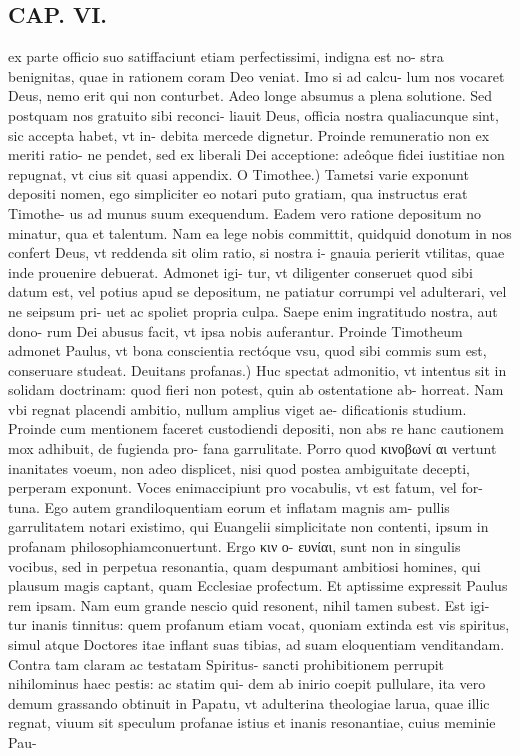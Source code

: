 \documentclass{article}
\begin{document}
\begin{pages}
\section*{CAP. VI. }
\marginpar{[ p.85 ]}\pstart ex parte officio suo satiffaciunt etiam perfectissimi, indigna est no- stra benignitas, quae in rationem coram Deo veniat. Imo si ad calcu- lum nos vocaret Deus, nemo erit qui non conturbet. Adeo longe absumus a plena solutione. Sed postquam nos gratuito sibi reconci- liauit Deus, officia nostra qualiacunque sint, sic accepta habet, vt in- debita mercede dignetur. Proinde remuneratio non ex meriti ratio- ne pendet, sed ex liberali Dei acceptione: adeôque fidei iustitiae non repugnat, vt cius sit quasi appendix.  \pend\pstart O Timothee.) Tametsi varie exponunt depositi nomen, ego simpliciter eo notari puto gratiam, qua instructus erat Timothe- us ad munus suum exequendum. Eadem vero ratione depositum no minatur, qua et talentum. Nam ea lege nobis committit, quidquid donotum in nos confert Deus, vt reddenda sit olim ratio, si nostra i- gnauia perierit vtilitas, quae inde prouenire debuerat. Admonet igi- tur, vt diligenter conseruet quod sibi datum est, vel potius apud se depositum, ne patiatur corrumpi vel adulterari, vel ne seipsum pri- uet ac spoliet propria culpa. Saepe enim ingratitudo nostra, aut dono- rum Dei abusus facit, vt ipsa nobis auferantur. Proinde Timotheum admonet Paulus, vt bona conscientia rectóque vsu, quod sibi commis sum est, conseruare studeat.  \pend\pstart Deuitans profanas.) Huc spectat admonitio, vt intentus sit in solidam doctrinam: quod fieri non potest, quin ab ostentatione ab- horreat. Nam vbi regnat placendi ambitio, nullum amplius viget ae- dificationis studium. Proinde cum mentionem faceret custodiendi depositi, non abs re hanc cautionem mox adhibuit, de fugienda pro- fana garrulitate. Porro quod κινοβωνί αι vertunt inanitates voeum, non adeo displicet, nisi quod postea ambiguitate decepti, perperam exponunt. Voces enimaccipiunt pro vocabulis, vt est fatum, vel for- tuna. Ego autem grandiloquentiam eorum et inflatam magnis am- pullis garrulitatem notari existimo, qui Euangelii simplicitate non contenti, ipsum in profanam philosophiamconuertunt. Ergo κιν ο- ευνίαι, sunt non in singulis vocibus, sed in perpetua resonantia, quam despumant ambitiosi homines, qui plausum magis captant, quam Ecclesiae profectum. Et aptissime expressit Paulus rem ipsam. Nam eum grande nescio quid resonent, nihil tamen subest. Est igi- tur inanis tinnitus: quem profanum etiam vocat, quoniam extinda est vis spiritus, simul atque Doctores itae inflant suas tibias, ad suam eloquentiam venditandam. Contra tam claram ac testatam Spiritus- sancti prohibitionem perrupit nihilominus haec pestis: ac statim qui- dem ab inirio coepit pullulare, ita vero demum grassando obtinuit in Papatu, vt adulterina theologiae larua, quae illic regnat, viuum sit speculum profanae istius et inanis resonantiae, cuius meminie Pau-  \pend

\end{pages}
\end{document}
